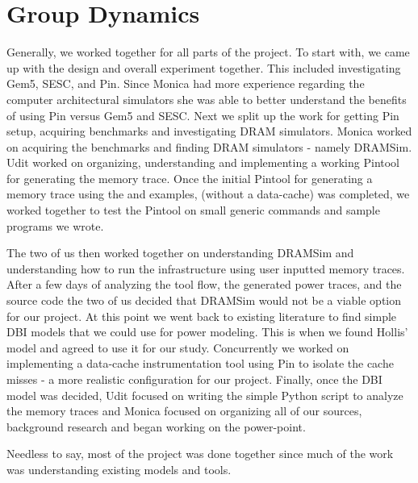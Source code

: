\section{Group Dynamics}
\label{sec-group-dynamics}

Generally, we worked together for all parts of the project. To start with, we
came up with the design and overall experiment together. This included
investigating Gem5, SESC, and Pin. Since Monica had more experience regarding
the computer architectural simulators she was able to better understand the
benefits of using Pin versus Gem5 and SESC. Next we split up the work for
getting Pin setup, acquiring benchmarks and investigating DRAM simulators.
Monica worked on acquiring the benchmarks and finding DRAM simulators - namely
DRAMSim. Udit worked on organizing, understanding and implementing a working
Pintool for generating the memory trace. Once the initial Pintool for
generating a memory trace using the  and  examples,
(without a data-cache) was completed, we worked together to test the Pintool on
small generic  commands and sample programs we wrote.

The two of us then worked together on understanding DRAMSim and understanding
how to run the infrastructure using user inputted memory traces. After a few
days of analyzing the tool flow, the generated power traces, and the source
code the two of us decided that DRAMSim would not be a viable option for our
project. At this point we went back to existing literature to find simple DBI
models that we could use for power modeling. This is when we found Hollis'
model \cite{hollis} and agreed to use it for our study. Concurrently we worked
on implementing a data-cache instrumentation tool using Pin to isolate the
cache misses - a more realistic configuration for our project. Finally, once
the DBI model was decided, Udit focused on writing the simple Python script to
analyze the memory traces and Monica focused on organizing all of our sources,
background research and began working on the power-point.

Needless to say, most of the project was done together since much of the work
was understanding existing models and tools.
